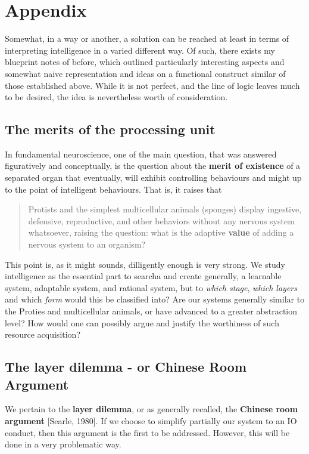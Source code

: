 \section{Appendix}
Somewhat, in a way or another, a solution can be reached at least in terms of interpreting intelligence in a varied different way. Of such, there exists my blueprint notes of before, which outlined particularly interesting aspects and somewhat naive representation and ideas on a functional construct similar of those established above. While it is not perfect, and the line of logic leaves much to be desired, the idea is nevertheless worth of consideration. 

\subsection{The merits of the processing unit}

In fundamental neuroscience, one of the main question, that was answered figuratively and conceptually, is the question about the \textbf{merit of existence} of a separated organ that eventually, will exhibit controlling behaviours and might up to the point of intelligent behaviours. That is, it raises that 
\begin{quote}
    Protists and the simplest multicellular animals (sponges) display ingestive, defensive, reproductive, and other behaviors without any nervous system whatsoever, raising the question: what is the adaptive \textbf{value} of adding a nervous system to an organism?
\end{quote}

This point is, as it might sounds, dilligently enough is very strong. We study intelligence as the essential part to searcha and create generally, a learnable system, adaptable system, and rational system, but to \textit{which stage}, \textit{which layers} and which \textit{form} would this be classified into? Are our systems generally similar to the Proties and multicellular animals, or have advanced to a greater abstraction level? How would one can possibly argue and justify the worthiness of such resource acquisition?

\subsection{The layer dilemma - or Chinese Room Argument}

We pertain to the \textbf{layer dilemma}, or as generally recalled, the \textbf{Chinese room argument} [Searle, 1980]. If we choose to simplify partially our system to an IO conduct, then this argument is the first to be addressed. However, this will be done in a very problematic way. 

